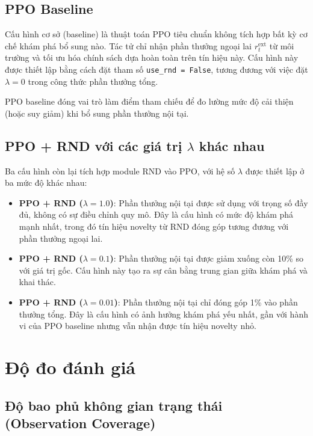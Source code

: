 \documentclass{uetgraduation}
\begin{document}
\subsection{PPO Baseline}

Cấu hình cơ sở (baseline) là thuật toán PPO tiêu chuẩn không tích hợp bất kỳ cơ chế khám phá bổ sung nào. Tác tử chỉ nhận phần thưởng ngoại lai $r_t^{\text{ext}}$ từ môi trường và tối ưu hóa chính sách dựa hoàn toàn trên tín hiệu này. Cấu hình này được thiết lập bằng cách đặt tham số \texttt{use\_rnd = False}, tương đương với việc đặt $\lambda = 0$ trong công thức phần thưởng tổng.

PPO baseline đóng vai trò làm điểm tham chiếu để đo lường mức độ cải thiện (hoặc suy giảm) khi bổ sung phần thưởng nội tại.

\subsection{PPO + RND với các giá trị $\lambda$ khác nhau}

Ba cấu hình còn lại tích hợp module RND vào PPO, với hệ số $\lambda$ được thiết lập ở ba mức độ khác nhau:

\begin{itemize}
    \item \textbf{PPO + RND ($\lambda = 1.0$)}: Phần thưởng nội tại được sử dụng với trọng số đầy đủ, không có sự điều chỉnh quy mô. Đây là cấu hình có mức độ khám phá mạnh nhất, trong đó tín hiệu novelty từ RND đóng góp tương đương với phần thưởng ngoại lai.
    
    \item \textbf{PPO + RND ($\lambda = 0.1$)}: Phần thưởng nội tại được giảm xuống còn 10\% so với giá trị gốc. Cấu hình này tạo ra sự cân bằng trung gian giữa khám phá và khai thác.
    
    \item \textbf{PPO + RND ($\lambda = 0.01$)}: Phần thưởng nội tại chỉ đóng góp 1\% vào phần thưởng tổng. Đây là cấu hình có ảnh hưởng khám phá yếu nhất, gần với hành vi của PPO baseline nhưng vẫn nhận được tín hiệu novelty nhỏ.
\end{itemize}

\section{Độ đo đánh giá}

\subsection{Độ bao phủ không gian trạng thái (Observation Coverage)}
\end{document}
